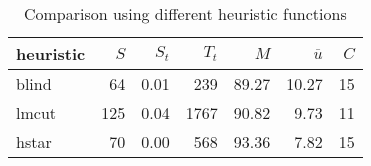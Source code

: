 \begin{table}[htbp]
\centering
\begingroup\small
\begin{tabular}{lrrrrrr}
  \hline
heuristic & $S$ & $S_t$ & $T_t$ & $M$ & $\overline{u}$ & $C$ \\ 
  \hline
blind &  64 & 0.01 & 239 & 89.27 & 10.27 &  15 \\ 
  lmcut & 125 & 0.04 & 1767 & 90.82 & 9.73 &  11 \\ 
  hstar &  70 & 0.00 & 568 & 93.36 & 7.82 &  15 \\ 
   \hline
\end{tabular}
\endgroup
\caption{Comparison using different heuristic functions} 
\label{tab:summary_heuristics}
\end{table}
